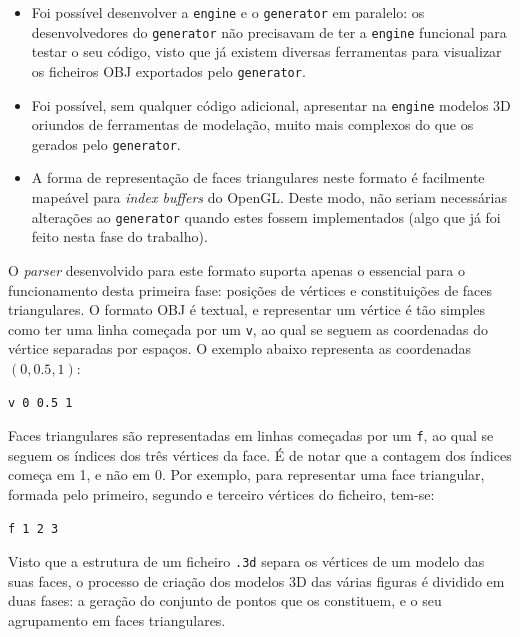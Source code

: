 \documentclass[12pt, a4paper]{article}
\begin{document}
\begin{itemize}
    \item Foi possível desenvolver a \texttt{engine} e o \texttt{generator} em paralelo: os
        desenvolvedores do \texttt{generator} não precisavam de ter a \texttt{engine} funcional para
        testar o seu código, visto que já existem diversas ferramentas para visualizar os ficheiros
        OBJ exportados pelo \texttt{generator}.

    \item Foi possível, sem qualquer código adicional, apresentar na \texttt{engine} modelos 3D
        oriundos de ferramentas de modelação, muito mais complexos do que os gerados pelo
        \texttt{generator}.

    \item A forma de representação de faces triangulares neste formato é facilmente mapeável para
        \emph{index buffers} do OpenGL. Deste modo, não seriam necessárias alterações ao
        \texttt{generator} quando estes fossem implementados (algo que já foi feito nesta fase do
        trabalho).
\end{itemize}

O \emph{parser} desenvolvido para este formato suporta apenas o essencial para o funcionamento desta
primeira fase: posições de vértices e constituições de faces triangulares. O formato OBJ é textual,
e representar um vértice é tão simples como ter uma linha começada por um \texttt{v}, ao qual se
seguem as coordenadas do vértice separadas por espaços. O exemplo abaixo representa as coordenadas
$(0, 0.5, 1)$:

\begin{verbatim}
v 0 0.5 1
\end{verbatim}

Faces triangulares são representadas em linhas começadas por um \texttt{f}, ao qual se seguem os
índices dos três vértices da face. É de notar que a contagem dos índices começa em 1, e não em 0.
Por exemplo, para representar uma face triangular, formada pelo primeiro, segundo e terceiro
vértices do ficheiro, tem-se:

\begin{verbatim}
f 1 2 3
\end{verbatim}

Visto que a estrutura de um ficheiro \texttt{.3d} separa os vértices de um modelo das suas faces, o
processo de criação dos modelos 3D das várias figuras é dividido em duas fases: a geração do
conjunto de pontos que os constituem, e o seu agrupamento em faces triangulares.
\end{document}
